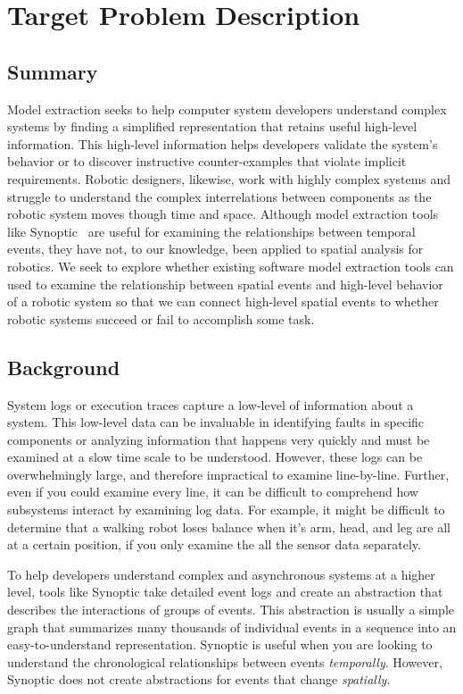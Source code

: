 \section{Target Problem Description}

\subsection{Summary}

Model extraction seeks to help computer system developers understand complex systems by finding a simplified representation that retains useful high-level information.
This high-level information helps developers validate the system's behavior or to discover instructive counter-examples that violate implicit requirements. 
Robotic designers, likewise, work with highly complex systems and struggle to understand the complex interrelations between components as the robotic system moves though time and space.
Although model extraction tools like Synoptic~\cite{schneider2010synoptic} are useful for examining the relationships between temporal events, they have not, to our knowledge, been applied to spatial analysis for robotics. 
We seek to explore whether existing software model extraction tools can used to examine the relationship between spatial events and high-level behavior of a robotic system so that we can connect high-level spatial events to whether robotic systems succeed or fail to accomplish some task.

\subsection{Background}

System logs or execution traces capture a low-level of information about a system. 
This low-level data can be invaluable in identifying faults in specific components or analyzing information that happens very quickly and must be examined at a slow time scale to be understood.
However, these logs can be overwhelmingly large, and therefore impractical to examine line-by-line.
Further, even if you could examine every line, it can be difficult to comprehend how subsystems interact by examining log data.
For example, it might be difficult to determine that a walking robot loses balance when it's arm, head, and leg are all at a certain position, if you only examine the all the sensor data separately.

To help developers understand complex and asynchronous systems at a higher level, tools like Synoptic take detailed event logs and create an abstraction that describes the interactions of groups of events.
This abstraction is usually a simple graph that summarizes many thousands of individual events in a sequence into an easy-to-understand representation.
Synoptic is useful when you are looking to understand the chronological relationships between events \emph{temporally}.
However, Synoptic does not create abstractions for events that change \emph{spatially}.

